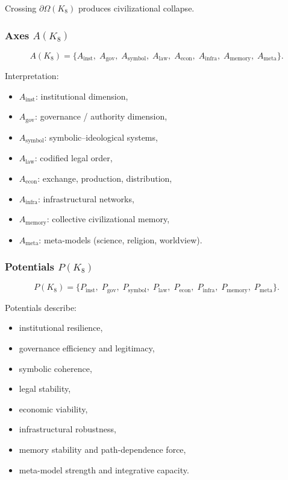 Crossing $\partial\Omega(K_8)$ produces civilizational collapse.

\subsubsection{Axes \texorpdfstring{$A(K_8)$}{A(K_8)}}

\[
A(K_8)=
\{
A_{\mathrm{inst}},\;
A_{\mathrm{gov}},\;
A_{\mathrm{symbol}},\;
A_{\mathrm{law}},\;
A_{\mathrm{econ}},\;
A_{\mathrm{infra}},\;
A_{\mathrm{memory}},\;
A_{\mathrm{meta}}
\}.
\]

Interpretation:
\begin{itemize}
    \item $A_{\mathrm{inst}}$: institutional dimension,
    \item $A_{\mathrm{gov}}$: governance / authority dimension,
    \item $A_{\mathrm{symbol}}$: symbolic–ideological systems,
    \item $A_{\mathrm{law}}$: codified legal order,
    \item $A_{\mathrm{econ}}$: exchange, production, distribution,
    \item $A_{\mathrm{infra}}$: infrastructural networks,
    \item $A_{\mathrm{memory}}$: collective civilizational memory,
    \item $A_{\mathrm{meta}}$: meta-models (science, religion, worldview).
\end{itemize}

\subsubsection{Potentials \texorpdfstring{$P(K_8)$}{P(K_8)}}

\[
P(K_8)=
\{
P_{\mathrm{inst}},\;
P_{\mathrm{gov}},\;
P_{\mathrm{symbol}},\;
P_{\mathrm{law}},\;
P_{\mathrm{econ}},\;
P_{\mathrm{infra}},\;
P_{\mathrm{memory}},\;
P_{\mathrm{meta}}
\}.
\]

Potentials describe:
\begin{itemize}
    \item institutional resilience,
    \item governance efficiency and legitimacy,
    \item symbolic coherence,
    \item legal stability,
    \item economic viability,
    \item infrastructural robustness,
    \item memory stability and path-dependence force,
    \item meta-model strength and integrative capacity.
\end{itemize}

